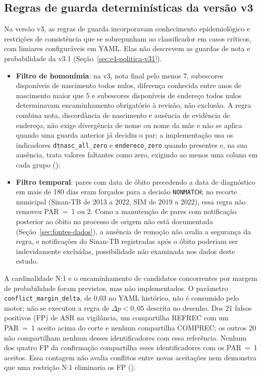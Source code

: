 \subsection{Regras de guarda determinísticas da versão v3}
\label{sec:e4-regras-guarda}

Na versão v3, as regras de guarda incorporavam conhecimento epidemiológico e restrições de consistência que se sobrepunham ao classificador em casos críticos, com limiares configuráveis em YAML. Elas não descrevem as guardas de nota e probabilidade da v3.1 (Seção~\ref{sec:e4-politica-v31}).

\begin{itemize}
\item \textbf{Filtro de homonímia}: na v3, nota final pelo menos 7, subescores disponíveis de nascimento todos nulos, diferença conhecida entre anos de nascimento maior que 5 e subescores disponíveis de endereço todos nulos determinavam encaminhamento obrigatório à revisão, não exclusão. A regra combina nota, discordância de nascimento e ausência de evidência de endereço, não exige divergência de nome ou nome da mãe e não se aplica quando uma guarda anterior já decidiu o par; a implementação usa os indicadores \texttt{dtnasc\_all\_zero} e \texttt{endereco\_zero} quando presentes e, na sua ausência, trata valores faltantes como zero, exigindo ao menos uma coluna em cada grupo ();
\item \textbf{Filtro temporal}: pares com data de óbito precedendo a data de diagnóstico em mais de 180 dias eram forçados para a decisão \texttt{NONMATCH}; no recorte municipal (Sinan-TB de 2013 a 2022, SIM de 2019 a 2022), essa regra não removeu PAR~=~1 ou 2. Como a manutenção de pares com notificação posterior ao óbito no processo de origem não está documentada (Seção~\ref{sec:fontes-dados}), a ausência de remoção não avalia a segurança da regra, e notificações do Sinan-TB registradas após o óbito poderiam ser indevidamente excluídas, possibilidade não examinada nos dados deste estudo.
\end{itemize}

A cardinalidade N:1 e o encaminhamento de candidatos concorrentes por margem de probabilidade foram previstos, mas não implementados. O parâmetro \texttt{conflict\_margin\_delta}, de 0,03 no YAML histórico, não é consumido pelo motor; não se executou a regra de $\Delta p<0{,}05$ descrita no desenho. Dos 21 falsos positivos (FP) de ASR na vigilância, um compartilha REFREC com um PAR~=~1 aceito acima do corte e nenhum compartilha COMPREC; os outros 20 não compartilham nenhum desses identificadores com essa referência. Nenhum dos quatro FP da confirmação compartilha esses identificadores com os PAR~=~1 aceitos. Essa contagem não avalia conflitos entre novas aceitações nem demonstra que uma restrição N:1 eliminaria os FP ().

